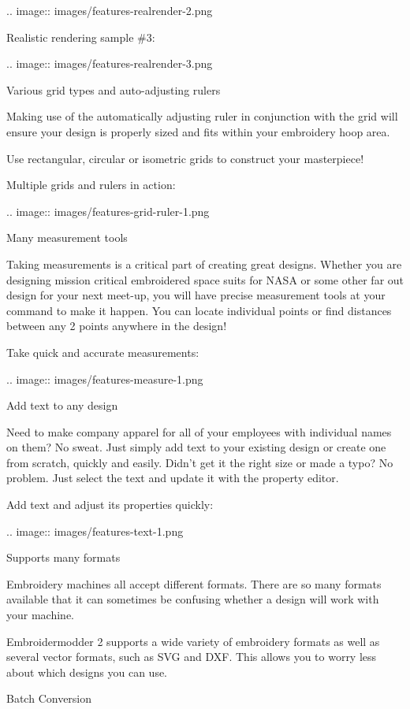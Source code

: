 \documentclass[a4paper]{report}
\begin{document}
.. image::
   images/features-realrender-2.png

Realistic rendering sample \#3:

.. image::
   images/features-realrender-3.png

Various grid types and auto-adjusting rulers

Making use of the automatically adjusting ruler in conjunction with the grid will ensure your design is properly sized and fits within your embroidery hoop area.

Use rectangular, circular or isometric grids to construct your masterpiece!

Multiple grids and rulers in action:

.. image::
   images/features-grid-ruler-1.png

Many measurement tools
~~~~~~~~~~~~~~~~~~~~~~

Taking measurements is a critical part of creating great designs. Whether you are designing mission critical embroidered space suits for NASA or some other far out design for your next meet-up, you will have precise measurement tools at your command to make it happen. You can locate individual points or find distances between any 2 points anywhere in the design!

Take quick and accurate measurements:

.. image::
   images/features-measure-1.png

Add text to any design
~~~~~~~~~~~~~~~~~~~~~~

Need to make company apparel for all of your employees with individual names on them? No sweat. Just simply add text to your existing design or create one from scratch, quickly and easily.
Didn't get it the right size or made a typo? No problem. Just select the text and update it with the property editor.

Add text and adjust its properties quickly:

.. image::
   images/features-text-1.png

Supports many formats
~~~~~~~~~~~~~~~~~~~~~

Embroidery machines all accept different formats. There are so many formats available that it can sometimes be confusing whether a design will work with your machine.

Embroidermodder 2 supports a wide variety of embroidery formats as well as several vector formats, such as SVG and DXF. This allows you to worry less about which designs you can use.

Batch Conversion
~~~~~~~~~~~~~~~~
\end{document}
